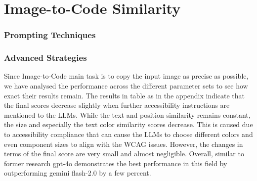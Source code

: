 \section{Image-to-Code Similarity}
\subsubsection{Prompting Techniques}
\subsubsection{Advanced Strategies}
Since Image-to-Code main task is to copy the input image as precise as possible,
we have analysed the performance across the different parameter sets to see how 
exact their results remain. The results in table as in the appendix 
indicate that the final scores decrease slightly when further accessibility 
instructions are mentioned to the LLMs. While the text and position similarity 
remains constant, the size and especially the text color similarity scores 
decrease. This is caused due to accessibility compliance that can cause the
LLMs to choose different colors and even component sizes to align with the 
WCAG issues. However, the changes in terms of the final score are very small 
and almost negligible.\newline
Overall, similar to former research gpt-4o demonstrates the best performance 
in this field by outperforming gemini flash-2.0 by a few percent.








